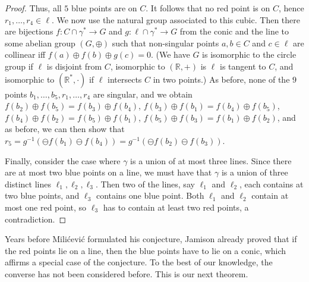 \documentclass[a4paper,11pt,leqno]{article}
\begin{document}
\begin{proof}
Thus, all $5$ blue points are on $C$.
It follows that no red point is on $C$, hence $r_1,\dots,r_4\in\ell$.
We now use the natural group associated to this cubic.
Then there are bijections $f: C\cap\gamma^*\to G$ and $g:\ell\cap\gamma^*\to G$ from the conic and the line to some abelian group $(G,\oplus)$ such that non-singular points $a,b\in C$ and $c\in\ell$ are collinear iff $f(a)\oplus f(b)\oplus g(c) = 0$.
(We have $G$ is isomorphic to the circle group if $\ell$ is disjoint from $C$, isomorphic to $(\mathbb{R},+)$ is $\ell$ is tangent to $C$, and isomorphic to $(\mathbb{R}^*,\cdot)$ if $\ell$ intersects $C$ in two points.)
As before, none of the $9$ points $b_1,\dots,b_5,r_1,\dots,r_4$ are singular, and we obtain $f(b_2)\oplus f(b_5)=f(b_3)\oplus f(b_4)$, 
$f(b_3)\oplus f(b_1)=f(b_4)\oplus f(b_5)$,
$f(b_4)\oplus f(b_2)=f(b_5)\oplus f(b_1)$,
$f(b_5)\oplus f(b_3)=f(b_1)\oplus f(b_2)$,
and as before, we can then show that $r_5=g^{-1}(\ominus f(b_1)\ominus f(b_4)) = g^{-1}(\ominus f(b_2)\ominus f(b_3))$.

Finally, consider the case where $\gamma$ is a union of at most three lines.
Since there are at most two blue points on a line, we must have that $\gamma$ is a union of three distinct lines $\ell_1,\ell_2,\ell_3$.
Then two of the lines, say $\ell_1$ and $\ell_2$, each contains at two blue points, and $\ell_3$ contains one blue point.
Both $\ell_1$ and $\ell_2$ contain at most one red point, so $\ell_3$ has to contain at least two red points, a contradiction.
\end{proof}



Years before Mili\'cevi\'c formulated his conjecture, Jamison \cite{jamison1986few} already proved that if the red points lie on a line, then the blue points have to lie on a conic, which affirms a special case of the conjecture.
To the best of our knowledge, the converse has not been considered before.
This is our next theorem.
\end{document}
